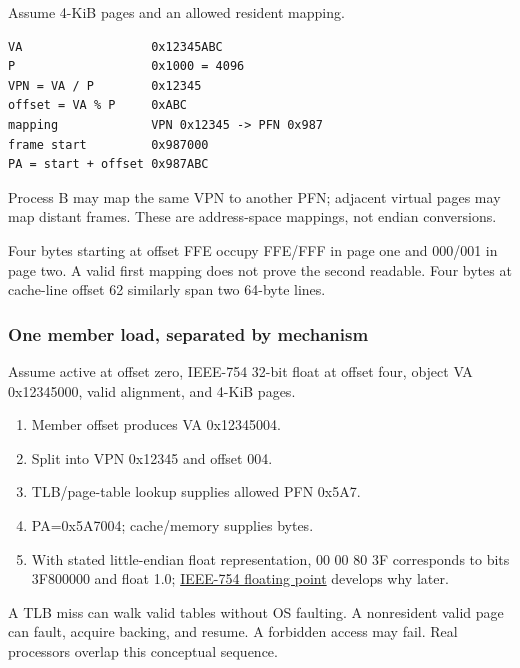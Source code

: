 \hypertarget{appendix-92ff77d4dfdc-page-translation-with-an-unchanged-offset}{}

Assume 4-KiB pages and an allowed resident mapping.

\begin{verbatim}
VA                  0x12345ABC
P                   0x1000 = 4096
VPN = VA / P        0x12345
offset = VA % P     0xABC
mapping             VPN 0x12345 -> PFN 0x987
frame start         0x987000
PA = start + offset 0x987ABC
\end{verbatim}

Process B may map the same VPN to another PFN; adjacent virtual pages may map distant frames. These are address-space mappings, not endian conversions.

Four bytes starting at offset FFE occupy FFE/FFF in page one and 000/001 in page two. A valid first mapping does not prove the second readable. Four bytes at cache-line offset 62 similarly span two 64-byte lines.

\subsubsection{One member load, separated by mechanism}\label{appendix-92ff77d4dfdc-one-member-load-separated-by-mechanism}

\hypertarget{appendix-92ff77d4dfdc-one-member-load-separated-by-mechanism}{}

Assume active at offset zero, IEEE-754 32-bit float at offset four, object VA 0x12345000, valid alignment, and 4-KiB pages.

\begin{enumerate}
\def\labelenumi{\arabic{enumi}.}
\tightlist
\item
  Member offset produces VA 0x12345004.
\item
  Split into VPN 0x12345 and offset 004.
\item
  TLB/page-table lookup supplies allowed PFN 0x5A7.
\item
  PA=0x5A7004; cache/memory supplies bytes.
\item
  With stated little-endian float representation, 00 00 80 3F corresponds to bits 3F800000 and float 1.0; \hyperref[appendix-343615f49ddf]{IEEE-754 floating point} develops why later.
\end{enumerate}

A TLB miss can walk valid tables without OS faulting. A nonresident valid page can fault, acquire backing, and resume. A forbidden access may fail. Real processors overlap this conceptual sequence.


